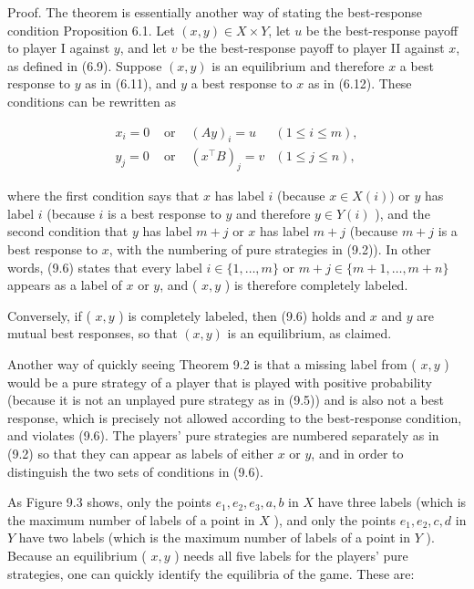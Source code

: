 \documentclass[12pt]{article}
\begin{document}
Proof. The theorem is essentially another way of stating the best-response condition Proposition 6.1. Let $(x, y) \in X \times Y$, let $u$ be the best-response payoff to player I against $y$, and let $v$ be the best-response payoff to player II against $x$, as defined in (6.9). Suppose $(x, y)$ is an equilibrium and therefore $x$ a best response to $y$ as in (6.11), and $y$ a best response to $x$ as in (6.12). These conditions can be rewritten as

\[
\begin{array}{llrl}
x_{i}=0 & \text { or } & (A y)_{i}=u & (1 \leq i \leq m), \\
y_{j}=0 & \text { or } & \left(x^{\top} B\right)_{j}=v & (1 \leq j \leq n), \tag{9.6}
\end{array}
\]

where the first condition says that $x$ has label $i$ (because $x \in X(i))$ or $y$ has label $i$ (because $i$ is a best response to $y$ and therefore $y \in Y(i)$ ), and the second condition that $y$ has label $m+j$ or $x$ has label $m+j$ (because $m+j$ is a best response to $x$, with the numbering of pure strategies in (9.2)). In other words, (9.6) states that every label $i \in\{1, \ldots, m\}$ or $m+j \in\{m+1, \ldots, m+n\}$ appears as a label of $x$ or $y$, and ( $x, y$ ) is therefore completely labeled.

Conversely, if ( $x, y$ ) is completely labeled, then (9.6) holds and $x$ and $y$ are mutual best responses, so that $(x, y)$ is an equilibrium, as claimed.

Another way of quickly seeing Theorem 9.2 is that a missing label from ( $x, y$ ) would be a pure strategy of a player that is played with positive probability (because it is not an unplayed pure strategy as in (9.5)) and is also not a best response, which is precisely not allowed according to the best-response condition, and violates (9.6). The players' pure strategies are numbered separately as in (9.2) so that they can appear as labels of either $x$ or $y$, and in order to distinguish the two sets of conditions in (9.6).

As Figure 9.3 shows, only the points $e_{1}, e_{2}, e_{3}, a, b$ in $X$ have three labels (which is the maximum number of labels of a point in $X$ ), and only the points $e_{1}, e_{2}, c, d$ in $Y$ have two labels (which is the maximum number of labels of a point in $Y$ ). Because an equilibrium ( $x, y$ ) needs all five labels for the players' pure strategies, one can quickly identify the equilibria of the game. These are:
\end{document}
